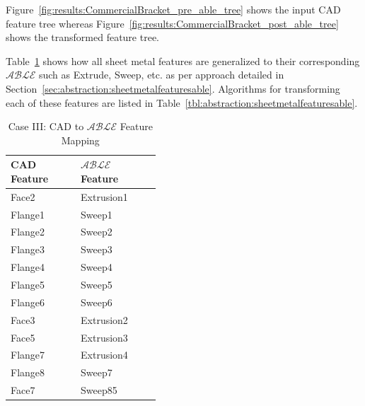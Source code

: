 
Figure~\ref{fig:results:CommercialBracket_pre_able_tree} shows the input CAD feature tree whereas Figure~\ref{fig:results:CommercialBracket_post_able_tree} shows the transformed feature tree. 


Table~\ref{tbl:results:cadablemapcomm1} shows how all sheet metal features are generalized to their corresponding $\mathcal{ABLE}$ such as Extrude, Sweep, etc. as per approach detailed in Section~\ref{sec:abstraction:sheetmetalfeaturesable}. Algorithms for transforming each of these features are listed in Table~\ref{tbl:abstraction:sheetmetalfeaturesable}.


\begin{table}[!h]
\centering
\caption{Case III: CAD to $\mathcal{ABLE}$ Feature Mapping}
\label{tbl:results:cadablemapcomm1}
\begin{tabular}[h]{@{} p{0.21\linewidth} p{0.21\linewidth} @{}}
\toprule
{\bf CAD Feature } & {$\mathcal{ABLE}$ Feature}\\ \midrule
Face2 & Extrusion1\\
Flange1 & Sweep1\\
Flange2 & Sweep2 \\
Flange3 & Sweep3\\
Flange4 & Sweep4 \\
Flange5 & Sweep5\\
Flange6 & Sweep6 \\
Face3 & Extrusion2\\
Face5 & Extrusion3\\
Flange7 & Extrusion4\\
Flange8 & Sweep7 \\
Face7 & Sweep85\\
\bottomrule
\end{tabular}

\end{table}










